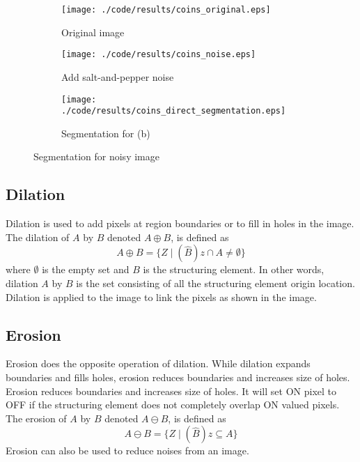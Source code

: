 \documentclass[journal,comsoc]{IEEEtran}
\begin{document}
\begin{figure}[!htb]
  \centering
  \begin{subfigure}[t]{.5\textwidth}
    \centering
    \texttt{[image: ./code/results/coins\_original.eps]}
    \caption{Original image}
    \label{subfig:./code/results/coins_original.eps}
  \end{subfigure}
  \begin{subfigure}[t]{.5\textwidth}
    \centering
    \texttt{[image: ./code/results/coins\_noise.eps]}
    \caption{Add salt-and-pepper noise}
    \label{subfig:./code/results/coins_noise.eps}
  \end{subfigure}
  \begin{subfigure}[t]{.5\textwidth}
    \centering
    \texttt{[image: ./code/results/coins\_direct\_segmentation.eps]}
    \caption{Segmentation for (b)}
    \label{subfig:./code/results/coins_direct_segmentation.eps}
  \end{subfigure}%

  \caption{Segmentation for noisy image}
  \label{fig:Segmentation for noisy image}
\end{figure}


\subsection{Dilation}

Dilation is used to add pixels at region boundaries or to fill in holes in the image. 
The dilation of $A$ by $B$ denoted $A\oplus{}B$, is defined as
\begin{equation}
A\oplus{B}=\{Z\mid{}(\hat{B})z\cap{A}\ne\emptyset\}
\end{equation}
where $\emptyset$ is the empty set and $B$ is the structuring element.
In other words, dilation $A$ by $B$ is the set consisting of all the
structuring element origin location. Dilation is applied to the image to
link the pixels as shown in the image.

\subsection{Erosion}

Erosion does the opposite operation of dilation. While dilation expands
boundaries and fills holes, erosion reduces boundaries and increases size of holes.
Erosion reduces boundaries and increases size of holes. It will set ON pixel to OFF
if the structuring element does not completely overlap ON valued pixels. The erosion
of $A$ by $B$ denoted $A\ominus{}B$, is defined as
\begin{equation}
A\ominus{}B=\{Z\mid{}(\hat{B})z\subseteq{A}\}
\end{equation}
Erosion can also be used to reduce noises from an image.
\end{document}
